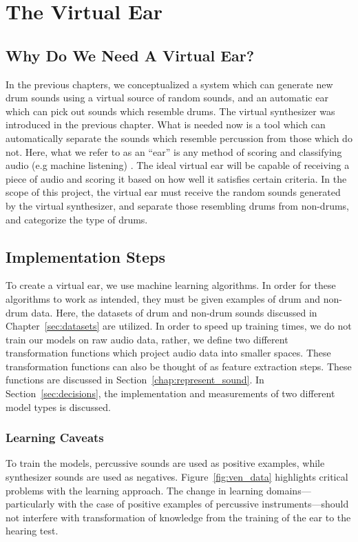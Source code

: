 \documentclass[\main/thesis.tex]{subfiles}
\begin{document}
\chapter{The Virtual Ear}
\section{Why Do We Need A Virtual Ear?}
\label{sec:ear}
In the previous chapters, we conceptualized a system which can generate new drum sounds using a virtual source of random sounds, and an automatic ear which can pick out sounds which resemble drums. The virtual synthesizer was introduced in the previous chapter. What is needed now is a tool which can automatically separate the sounds which resemble percussion from those which do not. Here, what we refer to as an \enquote{ear} is any method of scoring and classifying audio (e.g machine listening) \cite{malkin2006machine,rowe1992interactive}. The ideal virtual ear will be capable of receiving a piece of audio and scoring it based on how well it satisfies certain criteria. In the scope of this project, the virtual ear must receive the random sounds generated by the virtual synthesizer, and separate those resembling drums from non-drums, and categorize the type of drums. 
 
\section{Implementation Steps}
To create a virtual ear, we use machine learning algorithms. In order for these algorithms to work as intended, they must be given examples of drum and non-drum data. Here, the datasets of drum and non-drum sounds discussed in Chapter~\ref{sec:datasets} are utilized. In order to speed up training times, we do not train our models on raw audio data, rather, we define two different transformation functions which project audio data into smaller spaces. These transformation functions can also be thought of as feature extraction steps. These functions are discussed in Section~\ref{chap:represent_sound}. In Section~\ref{sec:decisions}, the implementation and measurements of two different model types is discussed.

\subsection{Learning Caveats}
To train the models, percussive sounds are used as positive examples, while synthesizer sounds are used as negatives. Figure~\ref{fig:ven_data} highlights critical problems with the learning approach. The change in learning domains---particularly with the case of positive examples of percussive instruments---should not interfere with transformation of knowledge from the training of the ear to the hearing test. 
\end{document}
